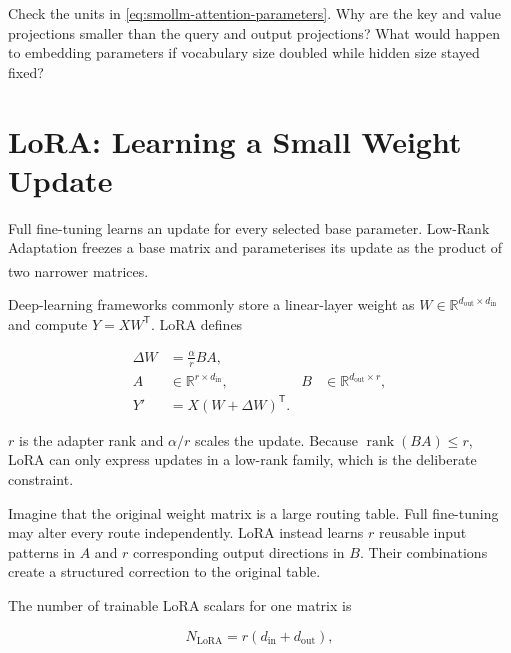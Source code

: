 \begin{checkpoint}
Check the units in \cref{eq:smollm-attention-parameters}.
Why are the key and value projections smaller than the query and output
projections?
What would happen to embedding parameters if vocabulary size doubled while
hidden size stayed fixed?
\end{checkpoint}

\section{LoRA: Learning a Small Weight Update}

Full fine-tuning learns an update for every selected base parameter.
Low-Rank Adaptation freezes a base matrix and parameterises its update as the
product of two narrower matrices.\textsuperscript{\cite{huLoRALowRank2021}}

Deep-learning frameworks commonly store a linear-layer weight as
$W\in\mathbb{R}^{d_{\mathrm{out}}\times d_{\mathrm{in}}}$ and compute
$Y=XW^{\mathsf T}$.
LoRA defines

\begin{align}
    \Delta W &= \frac{\alpha}{r}BA,
    \label{eq:lora-update}\\
    A &\in\mathbb{R}^{r\times d_{\mathrm{in}}},
    &B &\in\mathbb{R}^{d_{\mathrm{out}}\times r},
    \label{eq:lora-shapes}\\
    Y' &= X(W+\Delta W)^{\mathsf T}.
    \label{eq:lora-forward}
\end{align}

$r$ is the adapter rank and $\alpha/r$ scales the update.
Because $\operatorname{rank}(BA)\leq r$, LoRA can only express updates in a
low-rank family, which is the deliberate constraint.

\begin{plainlanguage}
Imagine that the original weight matrix is a large routing table.
Full fine-tuning may alter every route independently.
LoRA instead learns $r$ reusable input patterns in $A$ and $r$ corresponding
output directions in $B$.
Their combinations create a structured correction to the original table.
\end{plainlanguage}

The number of trainable LoRA scalars for one matrix is

\begin{equation}
    N_{\mathrm{LoRA}} = r(d_{\mathrm{in}}+d_{\mathrm{out}}),
    \label{eq:lora-parameter-count}
\end{equation}

